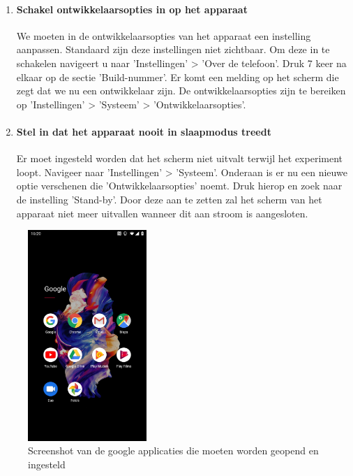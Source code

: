 \begin{enumerate}
    \item
    \paragraph{Schakel ontwikkelaarsopties in op het apparaat}
    \label{itm:developersettings}

    We moeten in de ontwikkelaarsopties van het apparaat een instelling aanpassen. Standaard zijn deze instellingen niet zichtbaar. Om deze in te schakelen navigeert u naar 'Instellingen' > 'Over de telefoon'. Druk 7 keer na elkaar op de sectie 'Build-nummer'. Er komt een melding op het scherm die zegt dat we nu een ontwikkelaar zijn. De ontwikkelaarsopties zijn te bereiken op 'Instellingen' > 'Systeem' > 'Ontwikkelaarsopties'.
    
    \item
    \paragraph{Stel in dat het apparaat nooit in slaapmodus treedt}
    \label{itm:disablesleep}
    
    Er moet ingesteld worden dat het scherm niet uitvalt terwijl het experiment loopt. Navigeer naar 'Instellingen' > 'Systeem'. Onderaan is er nu een nieuwe optie verschenen die 'Ontwikkelaarsopties' noemt. Druk hierop en zoek naar de instelling 'Stand-by'. Door deze aan te zetten zal het scherm van het apparaat niet meer uitvallen wanneer dit aan stroom is aangesloten.
\end{enumerate}

\begin{figure}
    \centering
    \includegraphics[width=0.4\textwidth]{img/googleapps.jpg}
    \caption{Screenshot van de google applicaties die moeten worden geopend en ingesteld}
    \label{fig:googleapps}
\end{figure}

